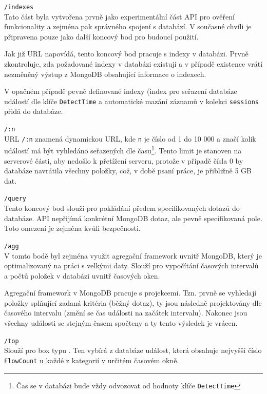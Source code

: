 \begin{description}
    \item \texttt{/indexes} \\
        Tato část byla vytvořena prvně jako experimentální část API pro ověření funkcionality a zejména pak správného spojení s databází. V současné chvíli je připravena pouze jako další koncový bod pro budoucí použití.

        Jak již URL napovídá, tento koncový bod pracuje s indexy v databázi. Prvně zkontroluje, zda požadované indexy v databázi existují a v případě existence vrátí nezměněný výstup z MongoDB obsahující informace o indexech.

        V opačném případě pevně definované indexy (index pro seřazení databáze událostí dle klíče \texttt{DetectTime} a automatické mazání záznamů v kolekci \texttt{sessions} přidá do databáze.
        
    \item \texttt{/:n}\\
        URL \texttt{/:n} znamená dynamickou URL, kde \texttt{n} je číslo od 1 do 10 000 a značí kolik událostí má být vyhledáno seřazených dle času\footnote{Čas se v databázi bude vždy odvozovat od hodnoty klíče \texttt{DetectTime}}. Tento limit je stanoven na serverové části, aby nedošlo k přetížení serveru, protože v případě čísla 0 by databáze navrátila všechny položky, což, v době psaní práce, je přibližně 5 GB dat.

    \item \texttt{/query}\\
        Tento koncový bod slouží pro pokládání předem specifikovaných dotazů do databáze. API nepřijímá konkrétní MongoDB dotaz, ale pevně specifikovaná pole. Toto omezení je zejména kvůli bezpečnosti. 

    \item \texttt{/agg}\\
        V tomto bodě byl zejména využit agregační framework uvnitř MongoDB, který je optimalizovaný na práci s velkými daty. Slouží pro vypočítání časových intervalů a počtů položek v databázi uvnitř časových oken.

        Agregační framework v MongoDB pracuje s projekcemi. Tzn. prvně se vyhledají položky splňující zadaná kritéria (běžný dotaz), ty jsou následně projektovány dle časového intervalu (změní se čas události na začátek intervalu). Nakonec jsou všechny události se stejným časem spočteny a ty tento výsledek je vrácen.

    \item \texttt{/top}\\
        Slouží pro box typu . Ten vybírá z databáze událost, která obsahuje nejvyšší číslo \texttt{FlowCount} u každé z kategorií v určitém časovém okně.


\end{description}
